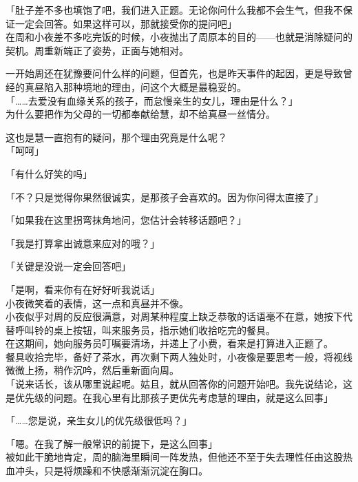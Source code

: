 「肚子差不多也填饱了吧，我们进入正题。无论你问什么我都不会生气，但我不保证一定会回答。如果这样可以，那就接受你的提问吧」\\

在周和小夜差不多吃完饭的时候，小夜抛出了周原本的目的——也就是消除疑问的契机。周重新端正了姿势，正面与她相对。

一开始周还在犹豫要问什么样的问题，但首先，也是昨天事件的起因，更是导致曾经的真昼陷入那种境地的理由，问这个大概是最稳妥的。\\

「……去爱没有血缘关系的孩子，而怠慢亲生的女儿，理由是什么？」\\

为什么要把作为父母的一切都奉献给慧，却不给真昼一丝情分。

这也是慧一直抱有的疑问，那个理由究竟是什么呢？\\

「呵呵」

「有什么好笑的吗」

「不？只是觉得你果然很诚实，是那孩子会喜欢的。因为你问得太直接了」

「如果我在这里拐弯抹角地问，您估计会转移话题吧？」

「我是打算拿出诚意来应对的哦？」

「关键是没说一定会回答吧」

「是啊，看来你有在好好听我说话」\\

小夜微笑着的表情，这一点和真昼并不像。\\

小夜似乎对周的反应很满意，对周某种程度上缺乏恭敬的话语毫不在意，她按下代替呼叫铃的桌上按钮，叫来服务员，指示她们收拾吃完的餐具。\\

在这期间，她向服务员叮嘱要清场，并递上了小费，看来是打算进入正题了。\\

餐具收拾完毕，备好了茶水，再次剩下两人独处时，小夜像是要思考一般，将视线微微上扬，稍作沉吟，然后重新面向周。\\

「说来话长，该从哪里说起呢。姑且，就从回答你的问题开始吧。我先说结论，这是优先级的问题。在我心里有比那孩子更优先考虑慧的理由，就是这么回事」

「……您是说，亲生女儿的优先级很低吗？」

「嗯。在我了解一般常识的前提下，是这么回事」\\

被如此干脆地肯定，周的脑海里瞬间一阵发热，但他还不至于失去理性任由这股热血冲头，只是将烦躁和不快感渐渐沉淀在胸口。\\

